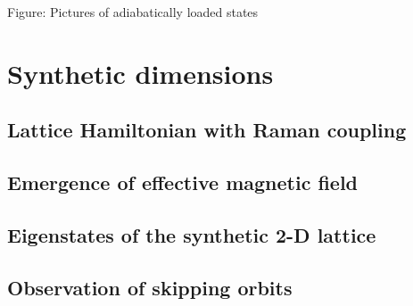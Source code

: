 Figure: Pictures of adiabatically loaded states


\section{Synthetic dimensions}\label{chap:4sec:syn_dim}


\subsection{Lattice Hamiltonian with Raman coupling}


\subsection{Emergence of effective magnetic field}


\subsection{Eigenstates of the synthetic 2-D lattice}


\subsection{Observation of skipping orbits}